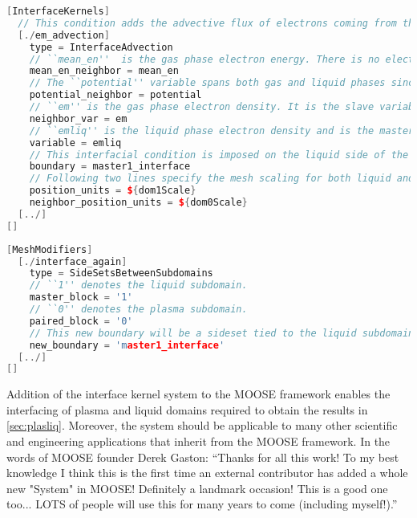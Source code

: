 \begin{lstlisting}[language=C++, caption = Example of input block for an interface kernel (InterfaceAdvection in this case), label = code:interface_input]
[InterfaceKernels]
  // This condition adds the advective flux of electrons coming from the gas phase to the balance equation of electrons in the liquid phase
  [./em_advection]
    type = InterfaceAdvection
    // ``mean_en''  is the gas phase electron energy. There is no electron energy variable in the liquid phase
    mean_en_neighbor = mean_en
    // The ``potential'' variable spans both gas and liquid phases since it is continuous at the interface
    potential_neighbor = potential
    // ``em'' is the gas phase electron density. It is the slave variable corresponding to the ``emliq'' master variable
    neighbor_var = em
    // ``emliq'' is the liquid phase electron density and is the master variable for this InterfaceAdvection object
    variable = emliq
    // This interfacial condition is imposed on the liquid side of the interface. ``1'' denotes the liquid subdomain. ``0'' denotes the plasma subdomain
    boundary = master1_interface
    // Following two lines specify the mesh scaling for both liquid and plasma subdomains respectively
    position_units = ${dom1Scale}
    neighbor_position_units = ${dom0Scale}
  [../]
[]
\end{lstlisting}

\begin{lstlisting}[language = C++, caption = Example of how to create a sideset\, in this case 'master1\_interface'\, that can then be used in definition of an interface kernel, label = code:sideset]
[MeshModifiers]
  [./interface_again]
    type = SideSetsBetweenSubdomains
    // ``1'' denotes the liquid subdomain.
    master_block = '1'
    // ``0'' denotes the plasma subdomain.
    paired_block = '0'
    // This new boundary will be a sideset tied to the liquid subdomain
    new_boundary = 'master1_interface'
  [../]
[]
\end{lstlisting}

Addition of the interface kernel system to the MOOSE framework enables the interfacing of plasma and liquid domains required to obtain the results in \cref{sec:plasliq}. Moreover, the system should be applicable to many other scientific and engineering applications that inherit from the MOOSE framework. In the words of MOOSE founder Derek Gaston: ``Thanks for all this work! To my best knowledge I think this is the first time an external contributor has added a whole new "System" in MOOSE! Definitely a landmark occasion! This is a good one too... LOTS of people will use this for many years to come (including myself!).''
